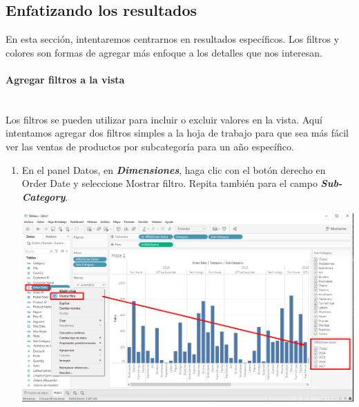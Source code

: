 \documentclass[12pt,letterpaper]{article}
\begin{document}
    \subsection{Enfatizando los resultados}
    En esta sección, intentaremos centrarnos en resultados específicos. Los filtros y colores son formas de agregar más enfoque a los detalles que nos interesan.
    \paragraph{\Large Agregar filtros a la vista\\ \\}
    Los filtros se pueden utilizar para incluir o excluir valores en la vista. Aquí intentamos agregar dos filtros simples a la hoja de trabajo para que sea más fácil ver las ventas de productos por subcategoría para un año específico.
    \begin{enumerate}
        \item En el panel Datos, en \textit{\textbf{Dimensiones}}, haga clic con el botón derecho en Order Date y seleccione Mostrar filtro. Repita también para el campo \textit{\textbf{Sub-Category}}.
        \begin{center}
            \includegraphics[width=15cm]{./img/img19.png}
        \end{center}
    \end{enumerate}
\end{document}
